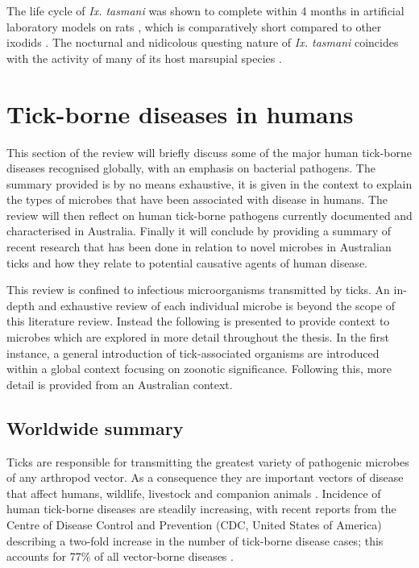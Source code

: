 \documentclass[a4paper, nobind]{templates/ociamthesis}
\begin{document}
The life cycle of \emph{Ix. tasmani} was shown to complete within 4 months in artificial laboratory models on rats \autocite{murdochEcologyCommonMarsupial2005}, which is comparatively short compared to other ixodids \autocite{oliverBiologySystematicsTicks1989}.
The nocturnal and nidicolous questing nature of \emph{Ix. tasmani} coincides with the activity of many of its host marsupial species \autocite{murdochEcologyCommonMarsupial2005}.

\hypertarget{tick-borne-diseases-in-humans}{%
\section{Tick-borne diseases in humans}\label{tick-borne-diseases-in-humans}}

This section of the review will briefly discuss some of the major human tick-borne diseases recognised globally, with an emphasis on bacterial pathogens.
The summary provided is by no means exhaustive, it is given in the context to explain the types of microbes that have been associated with disease in humans.
The review will then reflect on human tick-borne pathogens currently documented and characterised in Australia.
Finally it will conclude by providing a summary of recent research that has been done in relation to novel microbes in Australian ticks and how they relate to potential causative agents of human disease.

This review is confined to infectious microorganisms transmitted by ticks. An in-depth and exhaustive review of each individual microbe is beyond the scope of this literature review. Instead the following is presented to provide context to microbes which are explored in more detail throughout the thesis.
In the first instance, a general introduction of tick-associated organisms are introduced within a global context focusing on zoonotic significance.
Following this, more detail is provided from an Australian context.

\hypertarget{worldwide-summary}{%
\subsection{Worldwide summary}\label{worldwide-summary}}

Ticks are responsible for transmitting the greatest variety of pathogenic microbes of any arthropod vector.
As a consequence they are important vectors of disease that affect humans, wildlife, livestock and companion animals \autocite{jongejanGlobalImportanceTicks2004}.
Incidence of human tick-borne diseases are steadily increasing, with recent reports from the Centre of Disease Control and Prevention (CDC, United States of America) describing a two-fold increase in the number of tick-borne disease cases; this accounts for 77\% of all vector-borne diseases \autocite{rosenbergVitalSignsTrends2018}.
\end{document}
